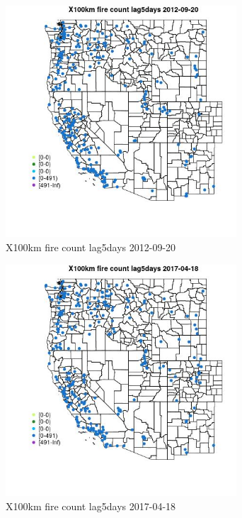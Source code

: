 \begin{figure} 
\centering  
\includegraphics[width=0.77\textwidth]{Code_Outputs/Report_ML_input_PM25_Step4_part_e_de_duplicated_aves_compiled_2019-05-14wNAs_MapObsX100km_fire_count_lag5days2012-09-20.jpg} 
\caption{\label{fig:Report_ML_input_PM25_Step4_part_e_de_duplicated_aves_compiled_2019-05-14wNAsMapObsX100km_fire_count_lag5days2012-09-20}X100km fire count lag5days 2012-09-20} 
\end{figure} 
 

\begin{figure} 
\centering  
\includegraphics[width=0.77\textwidth]{Code_Outputs/Report_ML_input_PM25_Step4_part_e_de_duplicated_aves_compiled_2019-05-14wNAs_MapObsX100km_fire_count_lag5days2017-04-18.jpg} 
\caption{\label{fig:Report_ML_input_PM25_Step4_part_e_de_duplicated_aves_compiled_2019-05-14wNAsMapObsX100km_fire_count_lag5days2017-04-18}X100km fire count lag5days 2017-04-18} 
\end{figure} 
 

